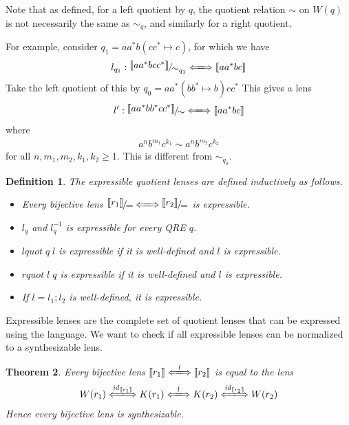 \documentclass[a4paper,11pt] {article}
\theoremstyle{plain}
\newtheorem{theorem}{Theorem}[section]
\newtheorem{definition}[theorem]{Definition}
\newcommand{\lquot}{\textit{lquot}}
\newcommand{\rquot}{\textit{rquot}}
\newcommand{\lensbetween}[1]{\xLongleftrightarrow{#1}}
\newcommand{\niceFrac}[2]{%
    \raise.5ex\hbox{$#1$}%
    \kern-.1em/\kern-.15em%
    \lower.25ex\hbox{$#2$}}
\begin{document}
Note that as defined, for a left quotient by $q$, the quotient
relation $\sim$ on $W(q)$ is not necessarily the same as
$\sim_q$, and similarly for a right quotient.

For example, consider $q_1 = aa^* b (cc^* \mapsto c)$, for which
we have
\begin{align*}
  l_{q_1}: \niceFrac{\llbracket aa^*bcc^* \rrbracket}{\sim_{q_1}} \lensbetween{}
  \llbracket aa^*bc \rrbracket
\end{align*}
Take the left quotient of this by $q_0 = aa^* (bb^* \mapsto b) cc^*$
This gives a lens
\begin{align*}
  l': \niceFrac{\llbracket aa^*bb^*cc^*\rrbracket}{\sim} \lensbetween{}
  \llbracket aa^*bc \rrbracket
\end{align*}
where
\begin{align*}
  a^n b^{m_1} c^{k_1} \sim a^n b^{m_2} c^{k_2}
\end{align*}
for all $n, m_1, m_2, k_1, k_2 \geq 1$.
This is different from $\sim_{q_0}$.

\begin{definition}
  The expressible quotient lenses are defined inductively
  as follows.
  \begin{itemize}
  \item Every bijective lens
    $\niceFrac{\llbracket r_1 \rrbracket}{=} \lensbetween{}
    \niceFrac{\llbracket r_2 \rrbracket}{=}$
    is expressible.
  \item $l_q$ and $l_q^{-1}$ is expressible for every QRE $q$.
  \item $\lquot \; q \; l$ is expressible if it is well-defined
    and $l$ is expressible.
  \item $\rquot \; l \; q$ is expressible if it is well-defined
    and $l$ is expressible.
  \item If $l = l_1; l_2$ is well-defined, it is expressible.
  \end{itemize}
\end{definition}
Expressible lenses are the complete set of quotient lenses that can
be expressed using the language.
We want to check if all expressible lenses can be normalized to a
synthesizable lens.

\begin{theorem}
  \label{thm:bijective-syn}
  Every bijective lens
  $\llbracket r_1 \rrbracket \lensbetween{l} \llbracket r_2
  \rrbracket$
  is equal to the lens
  \begin{align*}
    W(r_1) \lensbetween{\mathit{id}_{\llbracket r_1 \rrbracket}} K(r_1)
    \lensbetween{l}
    K(r_2) \lensbetween{\mathit{id}_{\llbracket r_2 \rrbracket}} W(r_2)
  \end{align*}
  Hence every bijective lens is synthesizable.
\end{theorem}
\end{document}
